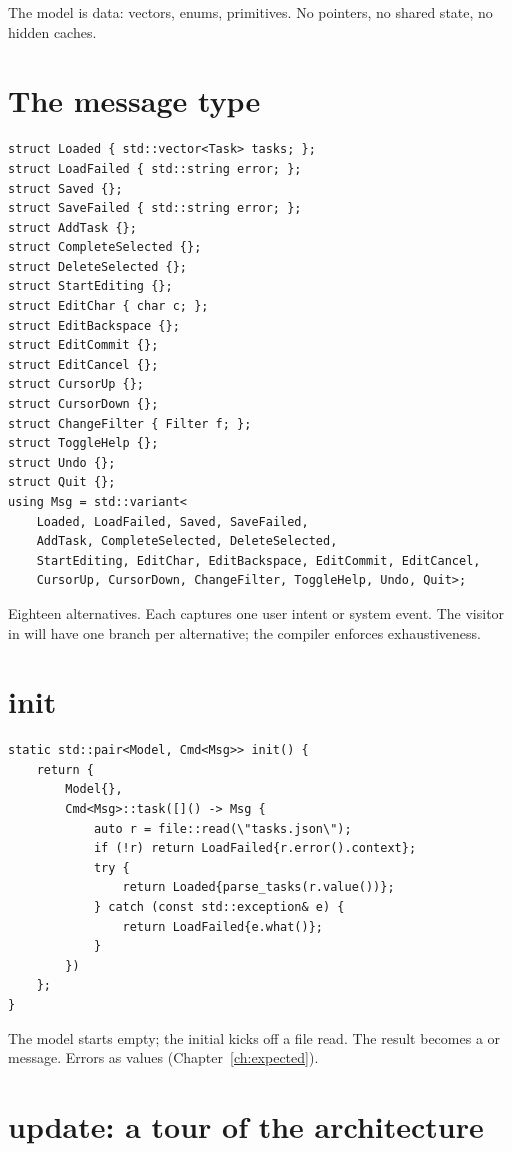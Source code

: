The model is data: vectors, enums, primitives. No pointers, no
shared state, no hidden caches.

\section{The message type}

\begin{lstlisting}
struct Loaded { std::vector<Task> tasks; };
struct LoadFailed { std::string error; };
struct Saved {};
struct SaveFailed { std::string error; };
struct AddTask {};
struct CompleteSelected {};
struct DeleteSelected {};
struct StartEditing {};
struct EditChar { char c; };
struct EditBackspace {};
struct EditCommit {};
struct EditCancel {};
struct CursorUp {};
struct CursorDown {};
struct ChangeFilter { Filter f; };
struct ToggleHelp {};
struct Undo {};
struct Quit {};
using Msg = std::variant<
    Loaded, LoadFailed, Saved, SaveFailed,
    AddTask, CompleteSelected, DeleteSelected,
    StartEditing, EditChar, EditBackspace, EditCommit, EditCancel,
    CursorUp, CursorDown, ChangeFilter, ToggleHelp, Undo, Quit>;
\end{lstlisting}

Eighteen alternatives. Each captures one user intent or system
event. The visitor in  will have one branch per
alternative; the compiler enforces exhaustiveness.

\section{init}

\begin{lstlisting}
static std::pair<Model, Cmd<Msg>> init() {
    return {
        Model{},
        Cmd<Msg>::task([]() -> Msg {
            auto r = file::read(\"tasks.json\");
            if (!r) return LoadFailed{r.error().context};
            try {
                return Loaded{parse_tasks(r.value())};
            } catch (const std::exception& e) {
                return LoadFailed{e.what()};
            }
        })
    };
}
\end{lstlisting}

The model starts empty; the initial  kicks off a
file read. The result becomes a  or 
message. Errors as values (Chapter~\ref{ch:expected}).

\section{update: a tour of the architecture}


